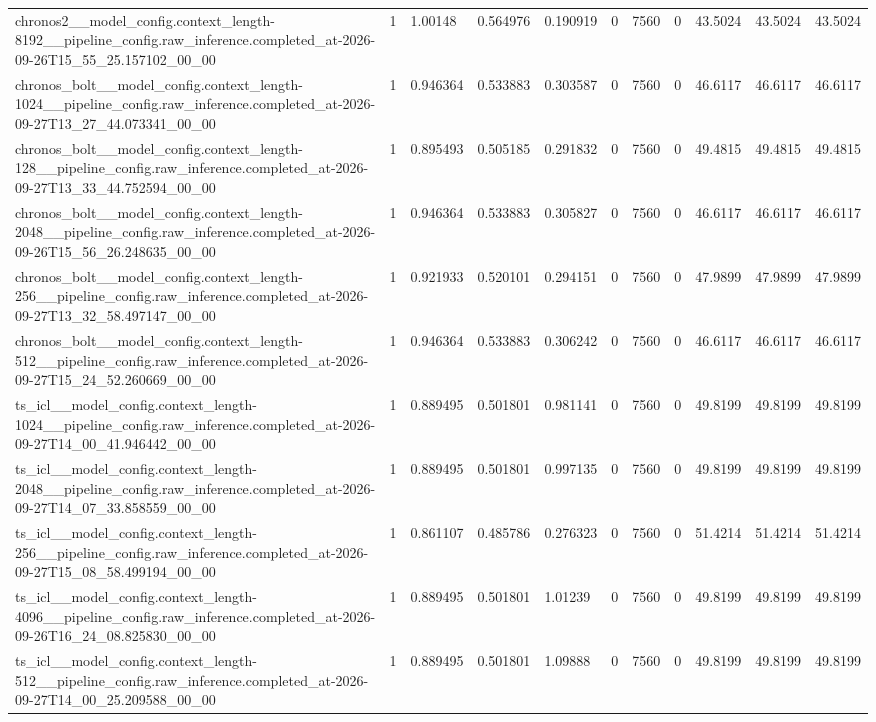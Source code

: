 \begin{tabular}{lllllllllll}
chronos2\_\_model\_config.context\_length-8192\_\_pipeline\_config.raw\_inference.completed\_at-2026-09-26T15\_55\_25.157102\_00\_00 & 1 & 1.00148 & 0.564976 & 0.190919 & 0 & 7560 & 0 & 43.5024 & 43.5024 & 43.5024 \\
chronos\_bolt\_\_model\_config.context\_length-1024\_\_pipeline\_config.raw\_inference.completed\_at-2026-09-27T13\_27\_44.073341\_00\_00 & 1 & 0.946364 & 0.533883 & 0.303587 & 0 & 7560 & 0 & 46.6117 & 46.6117 & 46.6117 \\
chronos\_bolt\_\_model\_config.context\_length-128\_\_pipeline\_config.raw\_inference.completed\_at-2026-09-27T13\_33\_44.752594\_00\_00 & 1 & 0.895493 & 0.505185 & 0.291832 & 0 & 7560 & 0 & 49.4815 & 49.4815 & 49.4815 \\
chronos\_bolt\_\_model\_config.context\_length-2048\_\_pipeline\_config.raw\_inference.completed\_at-2026-09-26T15\_56\_26.248635\_00\_00 & 1 & 0.946364 & 0.533883 & 0.305827 & 0 & 7560 & 0 & 46.6117 & 46.6117 & 46.6117 \\
chronos\_bolt\_\_model\_config.context\_length-256\_\_pipeline\_config.raw\_inference.completed\_at-2026-09-27T13\_32\_58.497147\_00\_00 & 1 & 0.921933 & 0.520101 & 0.294151 & 0 & 7560 & 0 & 47.9899 & 47.9899 & 47.9899 \\
chronos\_bolt\_\_model\_config.context\_length-512\_\_pipeline\_config.raw\_inference.completed\_at-2026-09-27T15\_24\_52.260669\_00\_00 & 1 & 0.946364 & 0.533883 & 0.306242 & 0 & 7560 & 0 & 46.6117 & 46.6117 & 46.6117 \\
ts\_icl\_\_model\_config.context\_length-1024\_\_pipeline\_config.raw\_inference.completed\_at-2026-09-27T14\_00\_41.946442\_00\_00 & 1 & 0.889495 & 0.501801 & 0.981141 & 0 & 7560 & 0 & 49.8199 & 49.8199 & 49.8199 \\
ts\_icl\_\_model\_config.context\_length-2048\_\_pipeline\_config.raw\_inference.completed\_at-2026-09-27T14\_07\_33.858559\_00\_00 & 1 & 0.889495 & 0.501801 & 0.997135 & 0 & 7560 & 0 & 49.8199 & 49.8199 & 49.8199 \\
ts\_icl\_\_model\_config.context\_length-256\_\_pipeline\_config.raw\_inference.completed\_at-2026-09-27T15\_08\_58.499194\_00\_00 & 1 & 0.861107 & 0.485786 & 0.276323 & 0 & 7560 & 0 & 51.4214 & 51.4214 & 51.4214 \\
ts\_icl\_\_model\_config.context\_length-4096\_\_pipeline\_config.raw\_inference.completed\_at-2026-09-26T16\_24\_08.825830\_00\_00 & 1 & 0.889495 & 0.501801 & 1.01239 & 0 & 7560 & 0 & 49.8199 & 49.8199 & 49.8199 \\
ts\_icl\_\_model\_config.context\_length-512\_\_pipeline\_config.raw\_inference.completed\_at-2026-09-27T14\_00\_25.209588\_00\_00 & 1 & 0.889495 & 0.501801 & 1.09888 & 0 & 7560 & 0 & 49.8199 & 49.8199 & 49.8199 \\

\end{tabular}
